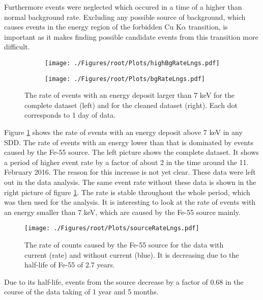 Furthermore events were neglected which occured in a time of a higher than normal background rate. Excluding any possible source of background, which causes events in the energy region of the forbidden Cu K$\alpha$ transition, is important as it makes finding possible candidate events from this transition more difficult. 
\begin{figure}[h]
 \centering
 \begin{subfigure}{.49\textwidth}
 \centering
 \texttt{[image: ./Figures/root/Plots/highBgRateLngs.pdf]}
 \end{subfigure}
 \hfill
 \begin{subfigure}{.46\textwidth}
 \centering
 \texttt{[image: ./Figures/root/Plots/bgRateLngs.pdf]}
 \end{subfigure}
 \caption{The rate of events with an energy deposit larger than 7 keV for the complete dataset (left) and for the cleaned dataset (right). Each dot corresponds to 1 day of data.}
 \label{fig:bgRateLngs}
\end{figure}
Figure \ref{fig:bgRateLngs} shows the rate of events with an energy deposit above 7 keV in any SDD. The rate of events with an energy lower than that is dominated by events caused by the Fe-55 source. The left picture shows the complete dataset. It shows a period of higher event rate by a factor of about 2 in the time around the 11. February 2016. The reason for this increase is not yet clear. These data were left out in the data analysis. The same event rate without these data is shown in the right picture of figure \ref{fig:bgRateLngs}. The rate is stable throughout the whole period, which was then used for the analysis. It is interesting to look at the rate of events with an energy smaller than 7 keV, which are caused by the Fe-55 source mainly.
\begin{figure}[h]
 \centering
 \texttt{[image: ./Figures/root/Plots/sourceRateLngs.pdf]}
 \caption{The rate of counts caused by the Fe-55 source for the data with current (rate) and without current (blue). It is decreasing due to the half-life of Fe-55 of 2.7 years.}
 \label{fig:sourceRateLngs}
\end{figure}
Due to its half-life, events from the source decrease by a factor of 0.68 in the course of the data taking of 1 year and 5 months.

